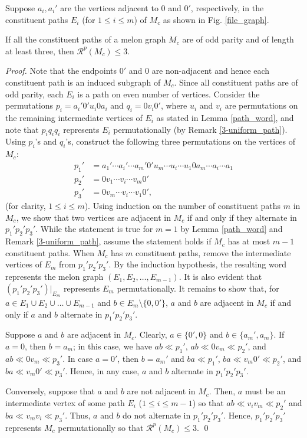 \documentclass{llncs}
\begin{document}
Suppose $a_i, a_i'$ are the vertices adjacent to $0$ and $0'$, respectively, in the constituent paths $E_i$ (for $1 \le i\le m$) of $M_c$ as shown in Fig. \ref{file_graph}. 

\begin{theorem}\label{odd_parity}
	If all the constituent paths of a melon graph $M_c$ are of odd parity and of length at least three, then $\mathcal{R}^p(M_c) \le 3$. 
\end{theorem}
\begin{proof}
	Note that the endpoints  $0'$ and $0$ are non-adjacent and hence each constituent path is an induced subgraph of $M_c$. 
	Since all constituent paths are of odd parity, each $E_i$ is a path on even number of vertices. Consider the permutations $p_i = a_i' 0' u_i 0 a_i$  and $q_i = 0 v_i 0' $, where $u_i$ and $v_i$ are permutations on the remaining intermediate vertices of $E_i$ as stated in Lemma \ref{path_word}, and note that $p_iq_iq_i$ represents $E_i$ permutationally  (by Remark \ref{3-uniform_path}). 
	Using $p_i$'s and $q_i$'s, construct the following three permutations on the vertices of $M_c$: 
	\begin{align*}
		p_1' &= a_1' \cdots a_i' \cdots a_m' 0' u_m  \cdots u_i \cdots u_1 0 a_m \cdots a_i \cdots a_1\\
		p_2' &= 0 v_1 \cdots v_i \cdots v_m 0'\\
		p_3' &= 0 v_m \cdots v_i \cdots v_1 0',
	\end{align*} (for clarity, $1 \le i \le m$).
	Using induction on the number of constituent paths $m$ in $M_c$, we show that two vertices are adjacent in $M_c$ if and only if they alternate in $p_1'p_2'p_3'$.	While the statement is true for $m=1$ by Lemma \ref{path_word} and Remark \ref{3-uniform_path},  assume the statement holds if $M_c$ has at most $m - 1$ constituent paths. When $M_c$ has $m$ constituent paths, remove the intermediate vertices of $E_{m}$ from $p_1'p_2'p_3'$. By the induction hypothesis, the resulting word represents the melon graph $(E_1, E_2,\ldots, E_{m-1})$. It is also evident that $(p_1'p_2'p_3')|_{E_m}$ represents $E_m$ permutationally. It remains to show that, for $a \in E_1 \cup E_2 \cup \ldots \cup E_{m-1}$ and $b \in E_{m} \setminus \{0,0'\}$, $a$ and $b$ are adjacent in $M_c$ if and only if $a$ and $b$ alternate in $p_1'p_2'p_3'$.
	
	Suppose  $a$ and $b$ are adjacent in $M_c$. Clearly, $a \in \{0',0\}$ and $b \in \{a_{m}', a_{m}\}$. If $a = 0$, then $b = a_{m}$; in this case, we have $ab \ll p_1'$, $ab \ll 0 v_{m} \ll p_2'$, and $a b \ll 0 v_{m} \ll p_3'$. In case $a = 0'$, then $b = a_{m}'$ and $ba \ll p_1'$, $ba \ll  v_{m}0' \ll p_2'$, and $ba \ll  v_{m}0' \ll p_3'$. Hence, in any case, $a$ and $b$ alternate in $p_1'p_2'p_3'$.
	
	Conversely, suppose that $a$ and $b$ are not adjacent in $M_c$. Then, $a$ must be an intermediate vertex of some path $E_i$ ($1 \le i \le m-1$) so that $ab \ll v_i v_{m} \ll p_2'$ and $ba \ll v_{m} v_{i} \ll p_3'$. Thus, $a$ and $b$ do not alternate in $p_1'p_2'p_3'$. Hence, $p_1'p_2'p_3'$ represents $M_c$ permutationally so that $\mathcal{R}^p(M_c) \le 3$.
	\qed
\end{proof}
\end{document}
